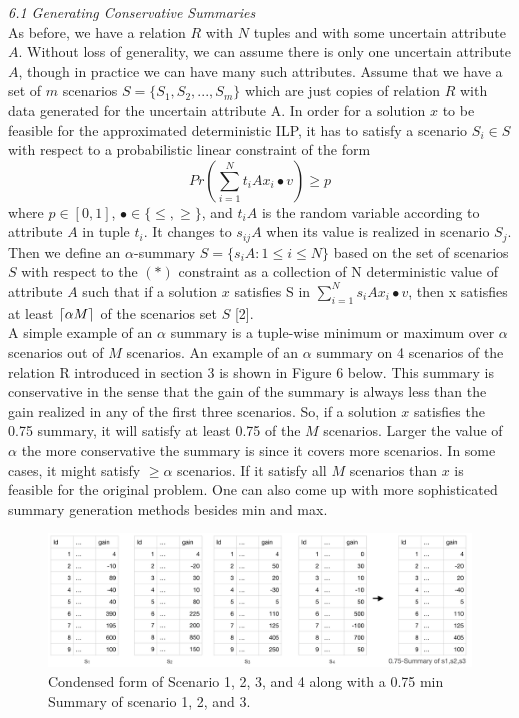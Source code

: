 \documentclass[a4paper,12pt]{article}
\DeclarePairedDelimiter\ceil{\lceil}{\rceil}
\begin{document}
\textit{6.1 Generating Conservative Summaries}
\\

As before, we have a relation $R$ with $N$ tuples and with some uncertain attribute $A$. Without loss of generality, we can assume there is only one uncertain attribute $A$, though in practice we can have many such attributes. Assume that we have a set of $m$ scenarios $S = \{S_1, S_2, ... ,S_m\}$ which are just copies of relation $R$ with data generated for the uncertain attribute A. In order for a solution $x$ to be feasible for the approximated deterministic ILP, it has to satisfy a scenario $S_i \in S$ with respect to a probabilistic linear constraint of the form 
\[
    Pr(\sum_{i=1}^N t_iA x_i \bullet v) \geq p \tag{*}
\]
where $p \in [0,1]$, $\bullet \in \{\leq,\geq\}$, and $t_iA$ is the random variable according to attribute $A$ in tuple $t_i$. It changes to $s_{ij}A$ when its value is realized in scenario $S_j$. 
Then we define an $\alpha$-summary $S=\{s_iA : 1 \leq i \leq N\}$ based on the set of scenarios $S$ with respect to the $(*)$ constraint as a collection of N deterministic value of attribute $A$ such that if a solution $x$ satisfies S in $\sum_{i=1}^N s_iA x_i \bullet v$, then x satisfies at least $\ceil{\alpha M}$ of the scenarios set $S$ [2]. 
\\

A simple example of an $\alpha$ summary is a tuple-wise minimum or maximum over $\alpha$ scenarios out of $M$ scenarios. An example of an $\alpha$ summary on 4 scenarios of the relation R introduced in section 3 is shown in Figure 6 below. This summary is conservative in the sense that the gain of the summary is always less than the gain realized in any of the first three scenarios. So, if a solution $x$ satisfies the 0.75 summary, it will satisfy at least 0.75 of the $M$ scenarios. Larger the value of $\alpha$ the more conservative the summary is since it covers more scenarios. In some cases, it might satisfy $\geq \alpha$ scenarios. If it satisfy all $M$ scenarios than $x$ is feasible for the original problem. One can also come up with more sophisticated summary generation methods besides min and max.
\begin{figure}[h]
\includegraphics[scale=.5]{5}
\caption{Condensed form of Scenario 1, 2, 3, and 4 along with a 0.75 min Summary of scenario 1, 2, and 3.}
\centering
\end{figure}
\\
\end{document}
